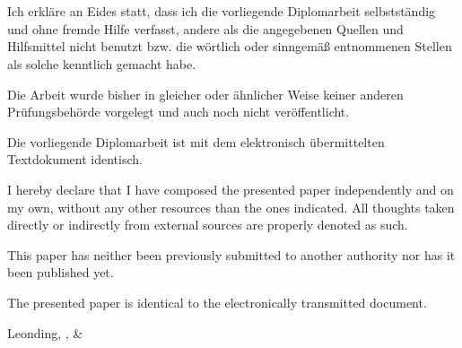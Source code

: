 
\thispagestyle{empty}
\vspace{3cm}
~ \\ \\
{
Ich erkläre an Eides statt, dass ich die vorliegende Diplomarbeit selbstständig und ohne fremde Hilfe verfasst, andere als die angegebenen Quellen und Hilfsmittel nicht benutzt bzw. die wörtlich oder sinngemäß entnommenen Stellen als solche kenntlich gemacht habe.

Die Arbeit wurde bisher in gleicher oder ähnlicher Weise keiner anderen Prüfungsbehörde vorgelegt und auch noch nicht veröffentlicht.

Die vorliegende Diplomarbeit ist mit dem elektronisch übermittelten Textdokument identisch.
}
{
I hereby declare that I have composed the presented paper independently and on my own, without any other resources than the ones indicated. 
All thoughts taken directly or indirectly from external sources are properly denoted as such.

This paper has neither been previously submitted to another authority nor has it been published yet.

The presented paper is identical to the electronically transmitted document.
}
\vspace{3cm}
\begin{tabbing}
Leonding,  \hspace{2cm} {\firstauthor} , {\secondauthor} \& \thirdauthor %
\end{tabbing}
\vspace{10cm}
